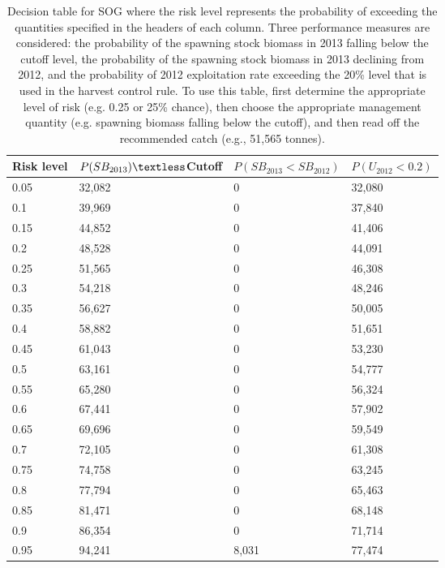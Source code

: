 %
\begin{table}[!tbp]
 \caption{Decision table for SOG where the risk 
			level represents the probability of exceeding the quantities specified
			in the headers of each column.  Three performance measures are considered:
			the probability of the spawning stock biomass in 2013 falling below the cutoff
			level,  the probability of the spawning stock biomass in 2013 declining from 2012, 
			and the probability of 2012 exploitation rate exceeding the 20\% level that is
			used in the harvest control rule. To use this table, first determine the 
			appropriate level of risk (e.g. 0.25 or 25\% chance),  then choose the appropriate
			management quantity (e.g. spawning biomass falling below the cutoff), and then read
			off the recommended catch (e.g., 51,565 tonnes).\label{Table:RiskSOG}} 
 \begin{center}
 \begin{tabular}{llll}\hline\hline
\multicolumn{1}{c}{Risk level}&\multicolumn{1}{c}{$P(SB_{2013})\textless$Cutoff}&\multicolumn{1}{c}{$P(SB_{2013}<SB_{2012})$}&\multicolumn{1}{c}{$P(U_{2012}<0.2)$}\tabularnewline
\hline
0.05&32,082&    0&32,080\tabularnewline
0.1&39,969&    0&37,840\tabularnewline
0.15&44,852&    0&41,406\tabularnewline
0.2&48,528&    0&44,091\tabularnewline
0.25&51,565&    0&46,308\tabularnewline
0.3&54,218&    0&48,246\tabularnewline
0.35&56,627&    0&50,005\tabularnewline
0.4&58,882&    0&51,651\tabularnewline
0.45&61,043&    0&53,230\tabularnewline
0.5&63,161&    0&54,777\tabularnewline
0.55&65,280&    0&56,324\tabularnewline
0.6&67,441&    0&57,902\tabularnewline
0.65&69,696&    0&59,549\tabularnewline
0.7&72,105&    0&61,308\tabularnewline
0.75&74,758&    0&63,245\tabularnewline
0.8&77,794&    0&65,463\tabularnewline
0.85&81,471&    0&68,148\tabularnewline
0.9&86,354&    0&71,714\tabularnewline
0.95&94,241&8,031&77,474\tabularnewline
\hline
\end{tabular}

\end{center}

\end{table}

